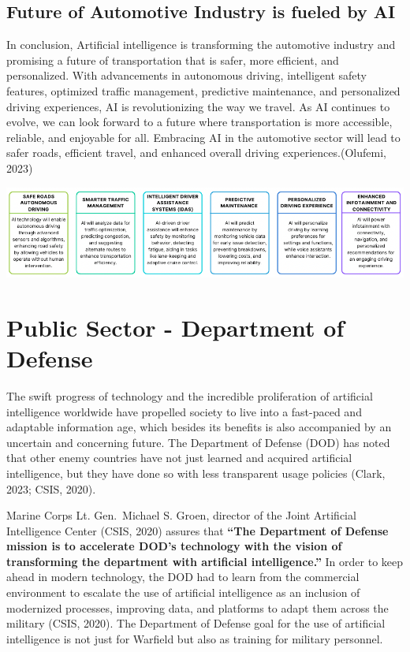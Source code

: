 \documentclass[
]{article}
\begin{document}
\hypertarget{future-of-automotive-industry-is-fueled-by-ai}{%
\subsection{Future of Automotive Industry is fueled by AI}\label{future-of-automotive-industry-is-fueled-by-ai}}

In conclusion, Artificial intelligence is transforming the automotive industry and promising a future of transportation that is safer, more efficient, and personalized. With advancements in autonomous driving, intelligent safety features, optimized traffic management, predictive maintenance, and personalized driving experiences, AI is revolutionizing the way we travel. As AI continues to evolve, we can look forward to a future where transportation is more accessible, reliable, and enjoyable for all. Embracing AI in the automotive sector will lead to safer roads, efficient travel, and enhanced overall driving experiences.(Olufemi, 2023)

\includegraphics{Canva.png}

\hypertarget{public-sector---department-of-defense}{%
\section{Public Sector - Department of Defense}\label{public-sector---department-of-defense}}

The swift progress of technology and the incredible proliferation of artificial intelligence worldwide have propelled society to live into a fast-paced and adaptable information age, which besides its benefits is also accompanied by an uncertain and concerning future. The Department of Defense (DOD) has noted that other enemy countries have not just learned and acquired artificial intelligence, but they have done so with less transparent usage policies (Clark, 2023; CSIS, 2020).

Marine Corps Lt. Gen.~Michael S. Groen, director of the Joint Artificial Intelligence Center (CSIS, 2020) assures that \textbf{``The Department of Defense mission is to accelerate DOD's technology with the vision of transforming the department with artificial intelligence.''} In order to keep ahead in modern technology, the DOD had to learn from the commercial environment to escalate the use of artificial intelligence as an inclusion of modernized processes, improving data, and platforms to adapt them across the military (CSIS, 2020). The Department of Defense goal for the use of artificial intelligence is not just for Warfield but also as training for military personnel.
\end{document}
